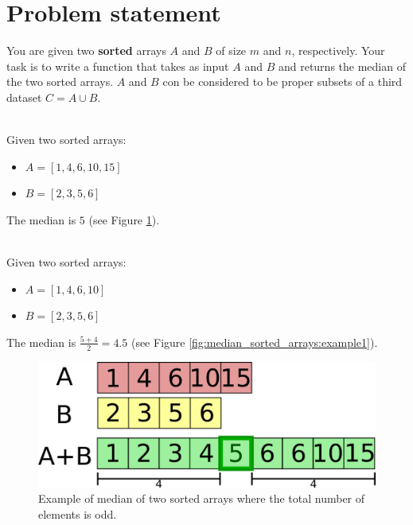 \section{Problem statement}
\begin{exercise}
You are given two \textbf{sorted} arrays $A$ and $B$ of size $m$ and $n$, respectively. Your task is
to write a function that takes as input $A$ and $B$ and returns the median of the two sorted arrays.
$A$ and $B$ con be considered to be proper subsets of a third dataset $C = A \cup B$. 

	\begin{example}
		\hfill \\
		Given two sorted arrays:
		\begin{itemize}
			\item $A=[1,4,6,10,15]$
			\item $B=[2,3,5,6]$
		\end{itemize}
		The median is $5$ (see Figure \ref{fig:median_sorted_arrays:example2}).
	\end{example}

	\begin{example}
		\hfill \\
		Given two sorted arrays:
		\begin{itemize}
			\item $A=[1,4,6,10]$
			\item $B=[2,3,5,6]$
		\end{itemize}
		The median is $\frac{5+4}{2} = 4.5$ (see Figure \ref{fig:median_sorted_arrays:example1}).
	\end{example}

\end{exercise}

\begin{figure}
	\label{fig:median_sorted_arrays:example2}
	\centering
	\includegraphics[scale=1.0]{sources/median_sorted_arrays/images/example2}
	\caption[Example of median of two sorted array.]{Example of median of two sorted arrays where the total number of elements is odd.}
\end{figure}

